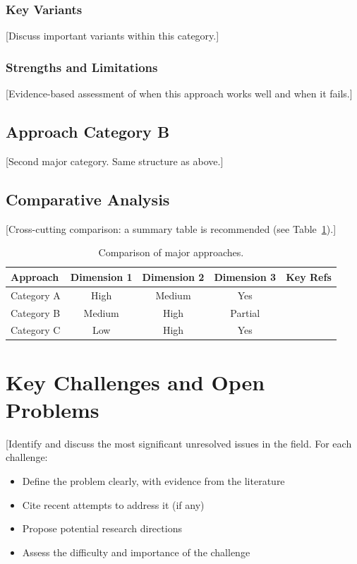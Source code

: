 \documentclass[11pt,a4paper]{article}
\begin{document}
\subsubsection{Key Variants}
[Discuss important variants within this category.]

\subsubsection{Strengths and Limitations}
[Evidence-based assessment of when this approach works well and when it fails.]

\subsection{Approach Category B}
[Second major category. Same structure as above.]

\subsection{Comparative Analysis}
[Cross-cutting comparison: a summary table is recommended (see Table~\ref{tab:comparison}).]

\begin{table}[ht]
\centering
\caption{Comparison of major approaches.}
\label{tab:comparison}
\begin{tabular}{lcccc}
\toprule
\textbf{Approach} & \textbf{Dimension 1} & \textbf{Dimension 2} & \textbf{Dimension 3} & \textbf{Key Refs} \\
\midrule
Category A \citep{a1} & High & Medium & Yes & \citep{a2,a3} \\
Category B \citep{b1} & Medium & High & Partial & \citep{b2,b3} \\
Category C \citep{c1} & Low & High & Yes & \citep{c2} \\
\bottomrule
\end{tabular}
\end{table}

\section{Key Challenges and Open Problems}
[Identify and discuss the most significant unresolved issues in the field.
For each challenge:
\begin{itemize}
    \item Define the problem clearly, with evidence from the literature
    \item Cite recent attempts to address it (if any)
    \item Propose potential research directions
    \item Assess the difficulty and importance of the challenge
\end{itemize}
\end{document}
